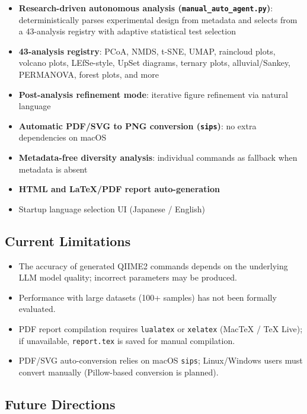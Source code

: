 \documentclass[12pt, a4paper]{article}
\begin{document}
\begin{itemize}
    interactive chat (Mode 3), and research-driven manual-auto (Mode 4)
  \item \textbf{Research-driven autonomous analysis (\texttt{manual\_auto\_agent.py})}:
    deterministically parses experimental design from metadata and selects from
    a 43-analysis registry with adaptive statistical test selection
  \item \textbf{43-analysis registry}: PCoA, NMDS, t-SNE, UMAP, raincloud plots,
    volcano plots, LEfSe-style, UpSet diagrams, ternary plots, alluvial/Sankey,
    PERMANOVA, forest plots, and more
  \item \textbf{Post-analysis refinement mode}:
    iterative figure refinement via natural language
  \item \textbf{Automatic PDF/SVG to PNG conversion (\texttt{sips})}:
    no extra dependencies on macOS
  \item \textbf{Metadata-free diversity analysis}:
    individual commands as fallback when metadata is absent
  \item \textbf{HTML and LaTeX/PDF report auto-generation}
  \item Startup language selection UI (Japanese / English)
\end{itemize}

\subsection{Current Limitations}

\begin{itemize}
  \item The accuracy of generated QIIME2 commands depends on
    the underlying LLM model quality; incorrect parameters may be produced.
  \item Performance with large datasets (100+ samples) has not been formally evaluated.
  \item PDF report compilation requires \texttt{lualatex} or \texttt{xelatex}
    (MacTeX / TeX Live); if unavailable, \texttt{report.tex} is saved for
    manual compilation.
  \item PDF/SVG auto-conversion relies on macOS \texttt{sips}; Linux/Windows
    users must convert manually (Pillow-based conversion is planned).
\end{itemize}

\subsection{Future Directions}
\end{document}
